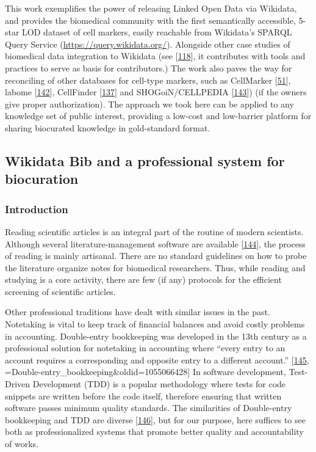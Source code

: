 This work exemplifies the power of releasing Linked Open Data via Wikidata, and provides the biomedical community with the first semantically accessible, 5-star LOD dataset of cell markers, easily reachable from Wikidata's SPARQL Query Service (\url{https://query.wikidata.org/}).
Alongside other case studies of biomedical data integration to Wikidata (see {[}\protect\hyperlink{ref-mPoPwN77}{118}{]}, it contributes with tools and practices to serve as basis for contributors.)
The work also paves the way for reconciling of other databases for cell-type markers, such as CellMarker {[}\protect\hyperlink{ref-chGii6yw}{51}{]}, labome {[}\protect\hyperlink{ref-rhRRCtlA}{142}{]}, CellFinder {[}\protect\hyperlink{ref-4AEy2xhQ}{137}{]} and SHOGoiN/CELLPEDIA {[}\protect\hyperlink{ref-6uWWsiSq}{143}{]}) (if the owners give proper authorization).
The approach we took here can be applied to any knowledge set of public interest, providing a low-cost and low-barrier platform for sharing biocurated knowledge in gold-standard format.

\hypertarget{wikidata-bib-and-a-professional-system-for-biocuration}{%
\subsection{Wikidata Bib and a professional system for biocuration}\label{wikidata-bib-and-a-professional-system-for-biocuration}}

\hypertarget{introduction-1}{%
\subsubsection{Introduction}\label{introduction-1}}

Reading scientific articles is an integral part of the routine of modern scientists.
Although several literature-management software are available {[}\protect\hyperlink{ref-SdbIYKUa}{144}{]}, the process of reading is mainly artisanal.
There are no standard guidelines on how to probe the literature organize notes for biomedical researchers.
Thus, while reading and studying is a core activity, there are few (if any) protocols for the efficient screening of scientific articles.

Other professional traditions have dealt with similar issues in the past.
Notetaking is vital to keep track of financial balances and avoid costly problems in accounting.
Double-entry bookkeeping was developed in the 13th century as a professional solution for notetaking in accounting where ``every entry to an account requires a corresponding and opposite entry to a different account.'' {[}\protect\hyperlink{ref-uYuz0opI}{145}, =Double-entry\_bookkeeping\&oldid=1055066428{]}
In software development, Test-Driven Development (TDD) is a popular methodology where tests for code snippets are written before the code itself, therefore ensuring that written software passes minimum quality standards.
The similarities of Double-entry bookkeeping and TDD are diverse {[}\protect\hyperlink{ref-KNGv5MPp}{146}{]}, but for our purpose, here suffices to see both as professionalized systems that promote better quality and accountability of works.

